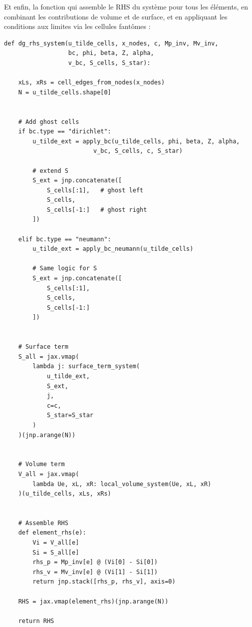 \documentclass[12pt,a4paper]{article}
\begin{document}
Et enfin, la fonction qui assemble le RHS du système pour tous les éléments, en combinant les contributions de volume et de surface, et en appliquant les conditions aux limites via les cellules fantômes :
\begin{verbatim}
def dg_rhs_system(u_tilde_cells, x_nodes, c, Mp_inv, Mv_inv,
                  bc, phi, beta, Z, alpha,
                  v_bc, S_cells, S_star):

    xLs, xRs = cell_edges_from_nodes(x_nodes)
    N = u_tilde_cells.shape[0]

   
    # Add ghost cells
    if bc.type == "dirichlet":
        u_tilde_ext = apply_bc(u_tilde_cells, phi, beta, Z, alpha,
                         v_bc, S_cells, c, S_star)

        # extend S
        S_ext = jnp.concatenate([
            S_cells[:1],   # ghost left
            S_cells,
            S_cells[-1:]   # ghost right
        ])

    elif bc.type == "neumann":
        u_tilde_ext = apply_bc_neumann(u_tilde_cells)

        # Same logic for S
        S_ext = jnp.concatenate([
            S_cells[:1],
            S_cells,
            S_cells[-1:]
        ])

    
    # Surface term
    S_all = jax.vmap(
        lambda j: surface_term_system(
            u_tilde_ext, 
            S_ext, 
            j,
            c=c,
            S_star=S_star
        )
    )(jnp.arange(N))

   
    # Volume term
    V_all = jax.vmap(
        lambda Ue, xL, xR: local_volume_system(Ue, xL, xR)
    )(u_tilde_cells, xLs, xRs)

    
    # Assemble RHS
    def element_rhs(e):
        Vi = V_all[e]
        Si = S_all[e]
        rhs_p = Mp_inv[e] @ (Vi[0] - Si[0])
        rhs_v = Mv_inv[e] @ (Vi[1] - Si[1])
        return jnp.stack([rhs_p, rhs_v], axis=0)

    RHS = jax.vmap(element_rhs)(jnp.arange(N))

    return RHS

\end{verbatim}
\end{document}
